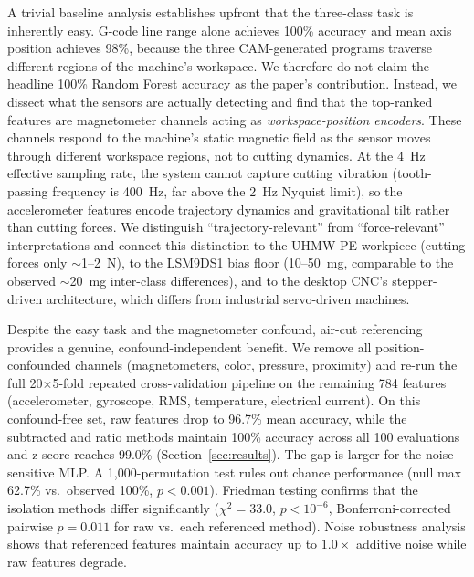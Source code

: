 A trivial baseline analysis establishes upfront that the three-class task is inherently easy. G-code line range alone achieves 100\% accuracy and mean axis position achieves 98\%, because the three CAM-generated programs traverse different regions of the machine's workspace. We therefore do not claim the headline 100\% Random Forest accuracy as the paper's contribution. Instead, we dissect what the sensors are actually detecting and find that the top-ranked features are magnetometer channels acting as \emph{workspace-position encoders}. These channels respond to the machine's static magnetic field as the sensor moves through different workspace regions, not to cutting dynamics. At the \SI{4}{\hertz} effective sampling rate, the system cannot capture cutting vibration (tooth-passing frequency is \SI{400}{\hertz}, far above the \SI{2}{\hertz} Nyquist limit), so the accelerometer features encode trajectory dynamics and gravitational tilt rather than cutting forces. We distinguish ``trajectory-relevant'' from ``force-relevant'' interpretations and connect this distinction to the UHMW-PE workpiece (cutting forces only $\sim$1--2~N), to the LSM9DS1 bias floor (10--50~mg, comparable to the observed $\sim$20~mg inter-class differences), and to the desktop CNC's stepper-driven architecture, which differs from industrial servo-driven machines.

Despite the easy task and the magnetometer confound, air-cut referencing provides a genuine, confound-independent benefit. We remove all position-confounded channels (magnetometers, color, pressure, proximity) and re-run the full 20$\times$5-fold repeated cross-validation pipeline on the remaining 784 features (accelerometer, gyroscope, RMS, temperature, electrical current). On this confound-free set, raw features drop to 96.7\% mean accuracy, while the subtracted and ratio methods maintain 100\% accuracy across all 100 evaluations and z-score reaches 99.0\% (Section~\ref{sec:results}). The gap is larger for the noise-sensitive MLP. A 1{,}000-permutation test rules out chance performance (null max 62.7\% vs.\ observed 100\%, $p < 0.001$). Friedman testing confirms that the isolation methods differ significantly ($\chi^2 = 33.0$, $p < 10^{-6}$, Bonferroni-corrected pairwise $p = 0.011$ for raw vs.\ each referenced method). Noise robustness analysis shows that referenced features maintain accuracy up to $1.0\times$ additive noise while raw features degrade.

